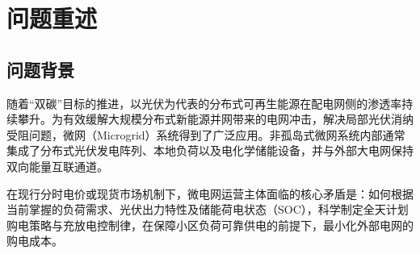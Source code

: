 \documentclass[withoutpreface]{cumcmthesis}
\begin{document}
\begin{abstract}
\textbf{针对问题四}，面向外部电网电价在 $[0.0076, 1.7936]$ 元/kWh 间全时段实时波动的严苛工况，构建了基于前 7 天同刻基准与对数残差的“负荷--光伏--电价”三维联合场景库；引入条件在险价值（CVaR），以 $0.8\mathbb{E}[C] + 0.2\text{CVaR}_{90}(C)$ 构建了兼顾期望收益与尾部极值风险的鲁棒决策模型，分别求解了波动电价下问题二与问题三的两套完整策略。结果表明：在问题二模式下，CVaR 策略成功将最贵 10\% 极端日电费均值压降 \textbf{3.59\%}，应急罚费削减 \textbf{43.25\%}（降至 $52.47\text{ 万元}$）；而在问题三模式下，引入滚动预报进一步平抑了现货价格冲击，全年总电费降至 \textbf{1458.76 万元}，应急电量压缩至 $8.56\text{ 万 kWh}$。模型成功导出了全量结果文件 \texttt{result4-2.xlsx} 与 \texttt{result4-3.xlsx}，展示出卓越的现货市场抗风险适应力。

最后，本文系统开展了储能转换效率口径敏感性与数值网格稳定性检验，评估了模型对参数扰动的鲁棒性，为现代微网参与电力现货市场交易提供了极具工程应用价值的量化调度方案。

\end{abstract}



\section{问题重述}

\subsection{问题背景}
随着“双碳”目标的推进，以光伏为代表的分布式可再生能源在配电网侧的渗透率持续攀升。为有效缓解大规模分布式新能源并网带来的电网冲击，解决局部光伏消纳受阻问题，微网（Microgrid）系统得到了广泛应用。非孤岛式微网系统内部通常集成了分布式光伏发电阵列、本地负荷以及电化学储能设备，并与外部大电网保持双向能量互联通道。

在现行分时电价或现货市场机制下，微电网运营主体面临的核心矛盾是：如何根据当前掌握的负荷需求、光伏出力特性及储能荷电状态（SOC），科学制定全天计划购电策略与充放电控制律，在保障小区负荷可靠供电的前提下，最小化外部电网的购电成本。
\end{document}
